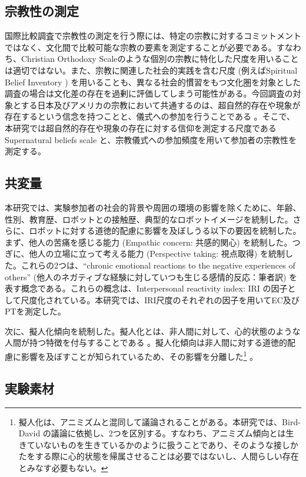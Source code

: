 \documentclass[a4j,12pt]{jreport}
\begin{document}
\subsection{宗教性の測定}
国際比較調査で宗教性の測定を行う際には、特定の宗教に対するコミットメントではなく、文化間で比較可能な宗教の要素を測定することが必要である。すなわち、Christian Orthodoxy Scale\cite{ortho}のような個別の宗教に特化した尺度を用いることは適切ではない。また、宗教に関連した社会的実践を含む尺度 (例えばSpiritual Belief Inventory \cite{holland}) を用いることも、異なる社会的慣習をもつ文化圏を対象とした調査の場合は文化差の存在を過剰に評価してしまう可能性がある。今回調査の対象とする日本及びアメリカの宗教において共通するのは、超自然的存在や現象が存在するという信念を持つことと、儀式への参加を行うことである\cite{kava} 。そこで、本研究では超自然的存在や現象の存在に対する信仰を測定する尺度であるSupernatural beliefs scale \cite{sbs}と、宗教儀式への参加頻度を用いて参加者の宗教性を測定する。


\subsection{共変量}
本研究では、実験参加者の社会的背景や周囲の環境の影響を除くために、年齢、性別、教育歴、ロボットとの接触歴、典型的なロボットイメージを統制した。さらに、ロボットに対する道徳的配慮に影響を及ぼしうる以下の要因を統制した。まず、他人の苦痛を感じる能力 (Empathic concern: 共感的関心) を統制した。つぎに、他人の立場に立って考える能力 (Perspective taking: 視点取得) を統制した。これらの2つは、“chronic emotional reactions to the negative experiences of others” (他人のネガティブな経験に対していつも生じる感情的反応：筆者訳) \cite{davis}を表す概念である。これらの概念は、Interpersonal reactivity index: IRI \cite{davis}の因子として尺度化されている。本研究では、IRI尺度のそれぞれの因子を用いてEC及びPTを測定した。


次に、擬人化傾向を統制した。擬人化とは、非人間に対して、心的状態のような人間が持つ特徴を付与することである\cite{idaq} 。擬人化傾向は非人間に対する道徳的配慮に影響を及ぼすことが知られているため、その影響を分離した\footnote{擬人化は、アニミズムと混同して議論されることがある。本研究では、Bird-David \cite{bird}の議論に依拠し、2つを区別する。すなわち、アニミズム傾向とは生きていないものを生きているかのように扱うことであり、そのような接しかたをする際に心的状態を帰属させることは必要ではないし、人間らしい存在とみなす必要もない。} 。

\subsection{実験素材}
\end{document}
